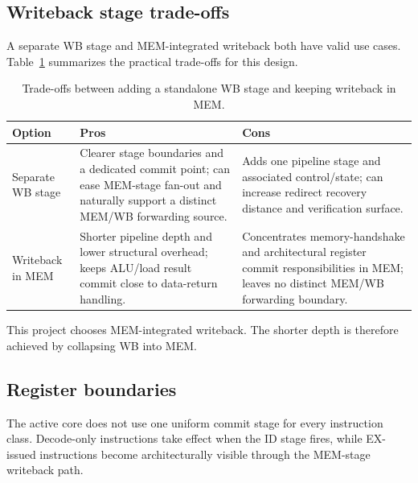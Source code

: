 \documentclass[11pt,a4paper]{article}
\begin{document}
\subsection{Writeback stage trade-offs}

A separate WB stage and MEM-integrated writeback both have valid use cases. Table~\ref{tab:wb_tradeoffs} summarizes the practical trade-offs for this design.

\begin{table}[H]
\centering
\begin{tabularx}{\linewidth}{@{}>{\ttfamily}lXX@{}}
\toprule
Option & Pros & Cons \\
\midrule
Separate WB stage & Clearer stage boundaries and a dedicated commit point; can ease MEM-stage fan-out and naturally support a distinct MEM/WB forwarding source. & Adds one pipeline stage and associated control/state; can increase redirect recovery distance and verification surface. \\
Writeback in MEM & Shorter pipeline depth and lower structural overhead; keeps ALU/load result commit close to data-return handling. & Concentrates memory-handshake and architectural register commit responsibilities in MEM; leaves no distinct MEM/WB forwarding boundary. \\
\bottomrule
\end{tabularx}
\caption{Trade-offs between adding a standalone WB stage and keeping writeback in MEM.}
\label{tab:wb_tradeoffs}
\end{table}

This project chooses MEM-integrated writeback. The shorter depth is therefore achieved by collapsing WB into MEM. %

\subsection{Register boundaries}

The active core does not use one uniform commit stage for every instruction class. Decode-only instructions take effect when the ID stage fires, while EX-issued instructions become architecturally visible through the MEM-stage writeback path.
\end{document}
